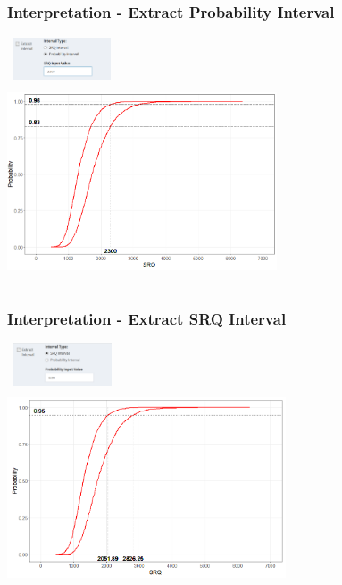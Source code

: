 \documentclass[handout, xcolor=dvipsnames]{beamer}
\begin{document}
\subsection{}
\begin{frame}
  \frametitle{Interpretation - Extract Probability Interval}
  \begin{center}
    \includegraphics[height=1.25cm, width=3.25cm]{figures/prob_int_ctrl.png} \\
    \includegraphics[height=5.75cm, width=8cm]{figures/prob_int.png}
  \end{center}
\end{frame}

\subsection{}
\begin{frame}
  \frametitle{Interpretation - Extract SRQ Interval}
  \begin{center}
    \includegraphics[height=1.25cm, width=3.25cm]{figures/srq_int_ctrl.png} \\
    \includegraphics[height=5.75cm, width=8.25cm]{figures/srq_int.png}
  \end{center}
\end{frame}
\end{document}
